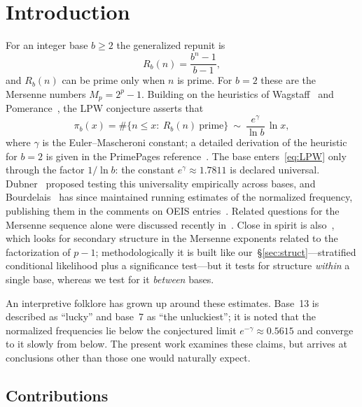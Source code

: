 \documentclass[11pt,a4paper]{article}
\theoremstyle{plain}
\theoremstyle{remark}
\newcommand{\Rb}{R_b}
\newcommand{\eg}{e^{\gamma}}
\newcommand{\emg}{e^{-\gamma}}
\begin{document}
\section{Introduction}

For an integer base $b\ge2$ the generalized repunit is
\begin{equation}\label{eq:Rb}
\Rb(n)=\frac{b^{n}-1}{b-1},
\end{equation}
and $\Rb(n)$ can be prime only when $n$ is prime. For $b=2$ these are the
Mersenne numbers $M_p=2^{p}-1$. Building on the heuristics of
Wagstaff~\cite{wagstaff1983} and Pomerance~\cite{pomerance1981}, the LPW
conjecture asserts that
\begin{equation}\label{eq:LPW}
\pi_b(x)=\#\{n\le x:\ \Rb(n)\ \text{prime}\}\ \sim\ \frac{\eg}{\ln b}\,\ln x,
\end{equation}
where $\gamma$ is the Euler--Mascheroni constant; a detailed derivation of the
heuristic for $b=2$ is given in the PrimePages reference~\cite{t5k}. The base
enters~\eqref{eq:LPW} only through the factor $1/\ln b$: the constant
$\eg\approx1.7811$ is declared universal. Dubner~\cite{dubner1993} proposed
testing this universality empirically across bases, and
Bourdelais~\cite{bourdelais2009} has since maintained running estimates of the
normalized frequency, publishing them in the comments on OEIS
entries~\cite{oeis}. Related questions for the Mersenne sequence alone were
discussed recently in~\cite{wagstaff2025}. Close in spirit is
also~\cite{dominguez2026}, which looks for secondary structure in the Mersenne
exponents related to the factorization of $p-1$; methodologically it is built
like our~\S\ref{sec:struct}---stratified conditional likelihood plus a
significance test---but it tests for structure \emph{within} a single base,
whereas we test for it \emph{between} bases.

An interpretive folklore has grown up around these estimates. Base~13 is
described as ``lucky'' and base~7 as ``the unluckiest''; it is noted that the
normalized frequencies lie below the conjectured limit $\emg\approx0.5615$ and
converge to it slowly from below. The present work examines these claims, but
arrives at conclusions other than those one would naturally expect.

\subsection{Contributions}
\end{document}
